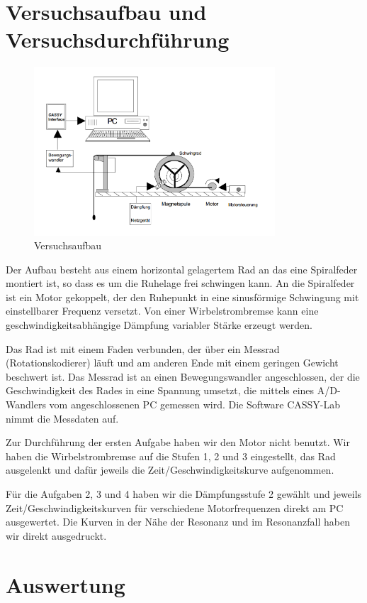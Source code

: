 \documentclass[a4paper,german,12pt,smallheadings]{scrartcl}
\begin{document}
\section{Versuchsaufbau und Versuchsdurchführung}
\begin{figure}
  \includegraphics[width=9cm]{aufbau.png}
  \caption{Versuchsaufbau}
\end{figure}
Der Aufbau besteht aus einem horizontal gelagertem Rad an das eine Spiralfeder
montiert ist, so dass es um die Ruhelage frei schwingen kann. An die
Spiralfeder ist ein Motor gekoppelt, der den Ruhepunkt in eine sinusförmige
Schwingung mit einstellbarer Frequenz versetzt. Von einer Wirbelstrombremse
kann eine geschwindigkeitsabhängige Dämpfung variabler Stärke erzeugt werden.

Das Rad ist mit einem Faden verbunden, der über ein Messrad (Rotationskodierer)
läuft und am anderen Ende mit einem geringen Gewicht beschwert ist. Das Messrad
ist an einen Bewegungswandler angeschlossen, der die Geschwindigkeit des Rades
in eine Spannung umsetzt, die mittels eines A/D-Wandlers vom angeschlossenen PC
gemessen wird. Die Software CASSY-Lab nimmt die Messdaten auf.

Zur Durchführung der ersten Aufgabe haben wir den Motor nicht benutzt. Wir
haben die Wirbelstrombremse auf die Stufen 1, 2 und 3 eingestellt, das Rad
ausgelenkt und dafür jeweils die Zeit/Geschwindigkeitskurve aufgenommen.

Für die Aufgaben 2, 3 und 4 haben wir die Dämpfungsstufe 2 gewählt und jeweils
Zeit/Geschwindigkeitskurven für verschiedene Motorfrequenzen direkt am PC
ausgewertet. Die Kurven in der Nähe der Resonanz und im Resonanzfall haben wir
direkt ausgedruckt.

\section{Auswertung}
\end{document}
